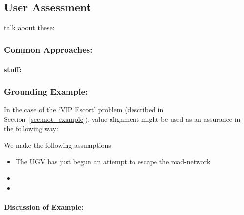 \subsection{User Assessment} \label{sec:user_assessment}
talk about these: \citet{Yu2018-qw, Wickens1999-la, Riley1996-qm, Muir1996-gt, Desai2012-rc}

\subsubsection{Common Approaches:}

\paragraph{stuff:}


\subsubsection{Grounding Example:}
In the case of the `VIP Escort' problem (described in Section~\ref{sec:mot_example}), value alignment might be used as an assurance in the following way:

We make the following assumptions

\begin{itemize}
    \item The UGV has just begun an attempt to escape the road-network
    \item 
    \item 
\end{itemize}

\paragraph{\textbf{Discussion of Example:}} 
